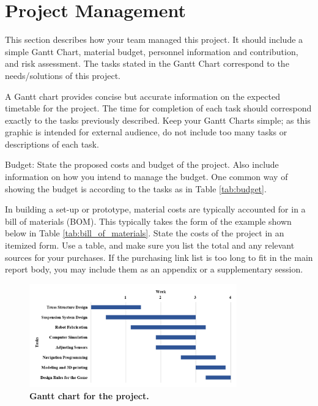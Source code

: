 \documentclass{engr1000j-s2}
\begin{document}
  \hspace{1em}

  \section{Project Management}

  This section describes how your team managed this project. It should include a
  simple Gantt Chart, material budget, personnel information and contribution,
  and risk assessment. The tasks stated in the Gantt Chart correspond to the needs/solutions
  of this project.

  A Gantt chart provides concise but accurate information on the expected timetable
  for the project. The time for completion of each task should correspond
  exactly to the tasks previously described. Keep your Gantt Charts simple; as
  this graphic is intended for external audience, do not include too many tasks or
  descriptions of each task.

  Budget: State the proposed costs and budget of the project. Also include information
  on how you intend to manage the budget. One common way of showing the budget
  is according to the tasks as in Table \ref{tab:budget}.

  In building a set-up or prototype, material costs are typically accounted for in
  a bill of materials (BOM). This typically takes the form of the example shown
  below in Table \ref{tab:bill_of_materials}. State the costs of the project in an
  itemized form. Use a table, and make sure you list the total and any relevant sources
  for your purchases. If the purchasing link list is too long to fit in the main
  report body, you may include them as an appendix or a supplementary session.

  \begin{figure}[!ht]
    \centering
    \includegraphics[width=0.8\textwidth]{figures/gantt_chart.png}
    \caption{\quad \textbf{Gantt chart for the project.}}
    \label{fig:gantt_chart}
  \end{figure}
\end{document}
